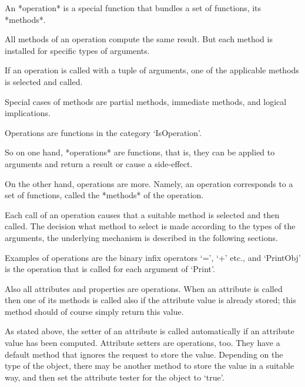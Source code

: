 

An *operation* is a special {\GAP} function that bundles a set of
functions, its *methods*.

All methods of an operation compute the same result.
But each method is installed for specific types of arguments.

If an operation is called with a tuple of arguments,
one of the applicable methods is selected and called.

Special cases of methods are partial methods, immediate methods,
and logical implications.


Operations are functions in the category `IsOperation'.

So on one hand, *operations* are {\GAP} functions, that is,
they can be applied to arguments and return a result or cause a
side-effect.

On the other hand, operations are more.
Namely, an operation corresponds to a set of {\GAP} functions,
called the *methods* of the operation.

Each call of an operation causes that a suitable method is selected
and then called.
The decision what method to select is made according to the types
of the arguments,
the underlying mechanism is described in the following sections.

Examples of operations are the binary infix operators `=', `+' etc.,
and `PrintObj' is the operation that is called for each argument of
`Print'.

Also all attributes and properties are operations.
When an attribute is called then one of its methods is called
also if the attribute value is already stored;
this method should of course simply return this value.

As stated above, the setter of an attribute is called automatically
if an attribute value has been computed.
Attribute setters are operations, too.
They have a default method that ignores the request to store the value.
Depending on the type of the object,
there may be another method to store the value in a suitable way,
and then set the attribute tester for the object to `true'.


